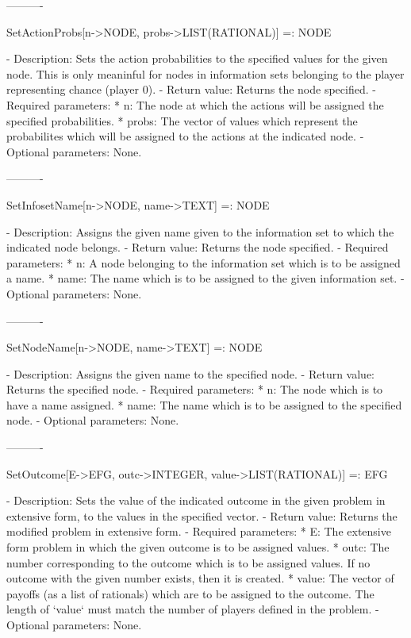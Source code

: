 ----------

SetActionProbs[n->NODE, probs->LIST(RATIONAL)] =: NODE

   -	Description:  Sets the action probabilities to the specified values 
	for the given node.  This is only meaninful for nodes in information
	sets belonging to the player representing chance (player 0).
   -	Return value:  Returns the node specified.
   -	Required parameters:
	  *  n:  The node at which the actions will be assigned the specified
		probabilities.
	  *  probs:  The vector of values which represent the probabilites 
		which will be assigned to the actions at the indicated node.
   -	Optional parameters:  None.

----------

SetInfosetName[n->NODE, name->TEXT] =: NODE

   -	Description:  Assigns the given name given to the information set to 
	which the indicated node belongs.
   -	Return value:  Returns the node specified.
   -	Required parameters:
	  *  n:  A node belonging to the information set which is to be 
		assigned a name.
	  *  name:  The name which is to be assigned to the given information
		set.
   -	Optional parameters:  None.

----------

SetNodeName[n->NODE, name->TEXT] =: NODE

   -	Description:  Assigns the given name to the specified node.
   -	Return value:  Returns the specified node.
   -	Required parameters:
	  *  n:  The node which is to have a name assigned.
	  *  name:  The name which is to be assigned to the specified node.
   -	Optional parameters:  None.

----------

SetOutcome[E->EFG, outc->INTEGER, value->LIST(RATIONAL)] =: EFG

   -	Description:  Sets the value of the indicated outcome in the given 
	problem in extensive form, to the values in the specified vector.
   -	Return value:  Returns the modified problem in extensive form. 
   -	Required parameters:
	  *  E:  The extensive form problem in which the given outcome is to be
		assigned values.
	  *  outc:  The number corresponding to the outcome which is to be 
		assigned values.  If no outcome with the given number exists,
		then it is created.
	  *  value:  The vector of payoffs (as a list of rationals) which are 
		to be assigned to the outcome.  The length of `value` must 
		match the number of players defined in the problem.
   -	Optional parameters:  None.


